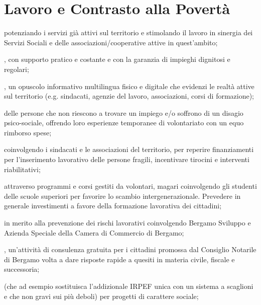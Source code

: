 \section{Lavoro e Contrasto alla Povertà}
 potenziando i servizi già attivi sul territorio e stimolando il lavoro in sinergia dei Servizi Sociali e delle associazioni/cooperative attive in quest'ambito;

, con supporto pratico e costante e con la garanzia di impieghi dignitosi e regolari; 

, un opuscolo informativo multilingua fisico e digitale che evidenzi le realtà attive sul territorio (e.g. sindacati, agenzie del lavoro, associazioni, corsi di formazione);

 delle persone che non riescono a trovare un impiego e/o soffrono di un disagio psico-sociale, offrendo loro esperienze temporanee di volontariato con un equo rimborso spese;

 coinvolgendo i sindacati e le associazioni del territorio, per reperire finanziamenti per l'inserimento lavorativo delle persone fragili, incentivare tirocini e interventi riabilitativi;

 attraverso programmi e corsi gestiti da volontari, magari coinvolgendo gli studenti delle scuole superiori per favorire lo scambio intergenerazionale. Prevedere in generale investimenti a favore della formazione lavorativa dei cittadini;

 in merito alla  prevenzione dei rischi lavorativi coinvolgendo  Bergamo Sviluppo e Azienda Speciale della Camera di Commercio di Bergamo;

, un'attività di consulenza gratuita per i cittadini promossa dal Consiglio Notarile di Bergamo volta a dare risposte rapide a quesiti in materia civile, fiscale e successoria;

 (che ad esempio sostituisca l'addizionale IRPEF unica con un sistema a scaglioni e che non gravi sui più deboli) per progetti di carattere sociale;

